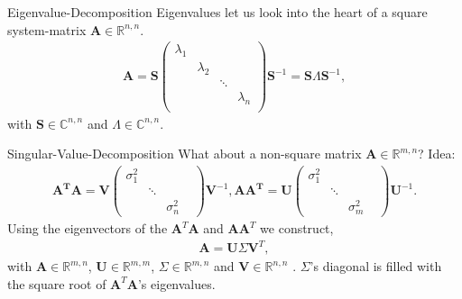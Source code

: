 \documentclass[notes]{beamer}
\begin{document}
  \begin{frame}{Eigenvalue-Decomposition \cite{strang2009introduction}}
  Eigenvalues let us look into the heart of a square system-matrix $\mathbf{A} \in \mathbb{R}^{n,n}$.
    \begin{align}
      \mathbf{A} 
      = \mathbf{S}\begin{pmatrix}
        \lambda_1 & & & \\
        & \lambda_2 & & \\
        & & \ddots    & \\
        & & & \lambda_n \\     
      \end{pmatrix}
      \mathbf{S}^{-1}
      =\mathbf{S}\Lambda \mathbf{S}^{-1},
    \end{align}
    with $\mathbf{S} \in \mathbb{C}^{n,n}$ and $\Lambda \in \mathbb{C}^{n,n}$. 
  \end{frame}

  \begin{frame}{Singular-Value-Decomposition \cite{strang2009introduction}}
    What about a non-square matrix $\mathbf{A} \in \mathbb{R}^{m,n}$? Idea:
    \begin{align}
      \mathbf{A^T}\mathbf{A} = \mathbf{V}
      \begin{pmatrix}
      \sigma_1^2 & & \\
      & \ddots & & \\
      & & \sigma_n^2   
      \end{pmatrix}
      \mathbf{V}^{-1},
      \mathbf{A}\mathbf{A^T} = \mathbf{U}
      \begin{pmatrix}
      \sigma_1^2 & & \\
      & \ddots & & \\
      & & \sigma_m^2   
      \end{pmatrix}
      \mathbf{U}^{-1}.
    \end{align}
    Using the eigenvectors of the $\mathbf{A}^T\mathbf{A}$ and $\mathbf{A}\mathbf{A}^T$ we construct, 
    \begin{align}
      \mathbf{A} = \mathbf{U}\Sigma \mathbf{V}^T,
    \end{align}
    with $\mathbf{A} \in \mathbb{R}^{m,n}$, $\mathbf{U} \in \mathbb{R}^{m,m}$, $\Sigma \in \mathbb{R}^{m,n}$ and $\mathbf{V} \in \mathbb{R}^{n,n}$ . $\Sigma$'s diagonal is filled with the square root of $\mathbf{A}^T \mathbf{A}$'s eigenvalues. 
  \end{frame}
\end{document}
